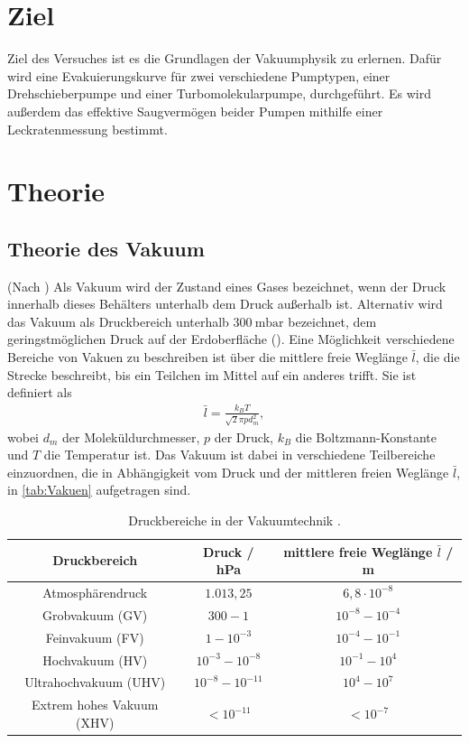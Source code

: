 \section{Ziel}
\label{sec:Ziel}

Ziel des Versuches ist es die Grundlagen der Vakuumphysik zu erlernen. Dafür wird eine Evakuierungskurve für zwei verschiedene Pumptypen, einer Drehschieberpumpe
und einer Turbomolekularpumpe, durchgeführt. Es wird außerdem das effektive Saugvermögen beider Pumpen mithilfe einer Leckratenmessung bestimmt.

\section{Theorie}
\label{sec:Theorie}

\subsection{Theorie des Vakuum}
\label{subsec:vakuum}

(Nach \cite{EinfuehrungVakuum}) Als Vakuum wird der Zustand eines Gases bezeichnet, wenn der Druck innerhalb dieses Behälters unterhalb dem Druck außerhalb ist. Alternativ wird das Vakuum als Druckbereich unterhalb
$\SI{300}{\milli\bar}$ bezeichnet, dem geringstmöglichen Druck auf der Erdoberfläche (\cite{Vakuumtechnik}). Eine Möglichkeit verschiedene Bereiche von Vakuen zu beschreiben ist über die mittlere freie Weglänge $\bar l$, die die
Strecke beschreibt, bis ein Teilchen im Mittel auf ein anderes trifft. Sie ist definiert als
\begin{align}
    \bar l = \frac{k_B T}{\sqrt 2 \pi p d_m^2},
\end{align}
wobei $d_m$ der Moleküldurchmesser, $p$ der Druck, $k_B$ die Boltzmann-Konstante und $T$ die Temperatur ist.
Das Vakuum ist dabei in verschiedene Teilbereiche einzuordnen, die in Abhängigkeit vom Druck
und der mittleren freien Weglänge $\bar l$, in \autoref{tab:Vakuen} aufgetragen sind.

\begin{table}[H]
    \centering
    \caption{Druckbereiche in der Vakuumtechnik \cite{EinfuehrungVakuum}.}
    \label{tab:Vakuen}
    \begin{tabular}{c c c}
        \toprule
        Druckbereich & Druck / hPa &  mittlere freie Weglänge $\bar l$ / m\\
        \midrule
        Atmosphärendruck    & $1.013,25$    & $6,8\cdot10^{-8}$   \\
        Grobvakuum (GV)     & $300 - 1$     & $10^{-8}-10^{-4}$   \\
        Feinvakuum (FV)     & $1 - 10^{-3}$ & $10^{-4} - 10^{-1}$ \\
        Hochvakuum (HV)     & $10^{-3} - 10^{-8}$ & $10^{-1} - 10^{4}$ \\
        Ultrahochvakuum (UHV) & $10^{-8} - 10^{-11}$ & $10^{4} - 10^{7}$ \\
        Extrem hohes Vakuum (XHV) & $<10^{-11}$ & $<10^{-7}$ \\
        \bottomrule
    \end{tabular}
\end{table}

